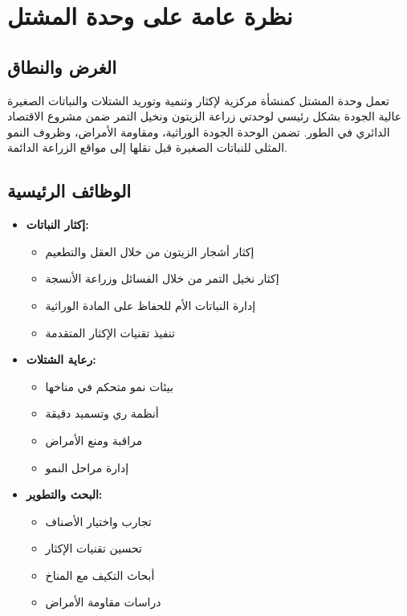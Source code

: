 \section{نظرة عامة على وحدة المشتل}

\subsection{الغرض والنطاق}
تعمل وحدة المشتل كمنشأة مركزية لإكثار وتنمية وتوريد الشتلات والنباتات الصغيرة عالية الجودة بشكل رئيسي لوحدتي زراعة الزيتون ونخيل التمر ضمن مشروع الاقتصاد الدائري في الطور. تضمن الوحدة الجودة الوراثية، ومقاومة الأمراض، وظروف النمو المثلى للنباتات الصغيرة قبل نقلها إلى مواقع الزراعة الدائمة.

\subsection{الوظائف الرئيسية}
\begin{itemize}
    \item \textbf{إكثار النباتات:}
    \begin{itemize}
        \item إكثار أشجار الزيتون من خلال العقل والتطعيم
        \item إكثار نخيل التمر من خلال الفسائل وزراعة الأنسجة
        \item إدارة النباتات الأم للحفاظ على المادة الوراثية
        \item تنفيذ تقنيات الإكثار المتقدمة
    \end{itemize}
    
    \item \textbf{رعاية الشتلات:}
    \begin{itemize}
        \item بيئات نمو متحكم في مناخها
        \item أنظمة ري وتسميد دقيقة
        \item مراقبة ومنع الأمراض
        \item إدارة مراحل النمو
    \end{itemize}
    
    \item \textbf{البحث والتطوير:}
    \begin{itemize}
        \item تجارب واختيار الأصناف
        \item تحسين تقنيات الإكثار
        \item أبحاث التكيف مع المناخ
        \item دراسات مقاومة الأمراض
    \end{itemize}
\end{itemize}

